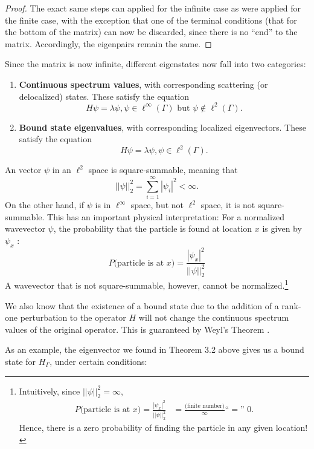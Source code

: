 \documentclass{article}
\newcommand{\hg}{H_\Gamma}
\numberwithin{equation}{section}
\numberwithin{theorem}{section}
\numberwithin{proposition}{section}
\numberwithin{lemma}{section}
\numberwithin{corollary}{section}
\numberwithin{definition}{section}
\begin{document}
\begin{proof}
	The exact same steps can applied for the infinite case as were applied for the finite case, with the exception that one of the terminal conditions (that for the bottom of the matrix) can now be discarded, since there is no ``end'' to the matrix. Accordingly, the eigenpairs remain the same.
\end{proof}

Since the matrix is now infinite, different eigenstates now fall into two categories:
\begin{enumerate}
	\item \textbf{Continuous spectrum values}, with corresponding scattering (or delocalized) states. These satisfy the equation
		\[
		H \psi = \lambda \psi, \psi \in \ell^\infty (\Gamma) \text{ but } \psi \notin \ell^2 (\Gamma).
		\]
	\item \textbf{Bound state eigenvalues}, with corresponding localized eigenvectors. These satisfy the equation
		\[
		H \psi = \lambda \psi, \psi \in \ell^2 (\Gamma).
		\]
\end{enumerate}

An vector $\psi$ in an $\ell^2$ space is square-summable, meaning that
	\[
	||\psi||^2_2 = \sum\limits_{i = 1}^\infty |\psi_i|^2 < \infty.
	\]
On the other hand, if $\psi$ is in $\ell^\infty$ space, but not $\ell^2$ space, it is not square-summable. This has an important physical interpretation: For a normalized wavevector $\psi$, the probability that the particle is found at location $x$ is given by $\psi_x$ \cite{griffiths}:
	\[
	P(\text{particle is at }x\text{)}= \frac{|\psi_x|^2}{||\psi||^2_2}
	\]
A wavevector that is not square-summable, however, cannot be normalized.\footnote{
	Intuitively, since $||\psi||^2_2 = \infty$, 
	\begin{align*}
	P(\text{particle is at }x\text{)}= \frac{|\psi_x|^2}{||\psi||^2_2} &= \frac{\text{(finite number)}}{\infty} 
		\text{``}= \text{'' } 0.
	\end{align*}
	Hence, there is a zero probability of finding the particle in any given location!
}

We also know that the existence of a bound state due to the addition of a rank-one perturbation to the operator $H$ will not change the continuous spectrum values of the original operator. This is guaranteed by Weyl's Theorem \cite{cremling}.

As an example, the eigenvector we found in Theorem 3.2 above gives us a bound state for $\hg$, under certain conditions:
\end{document}
